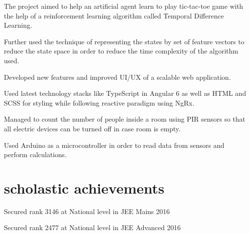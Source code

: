 \documentclass[]{deedy-resume-openfont}
\begin{document}
\begin{minipage}[t]{0.66\textwidth}
\begin{tightemize}
\item The project aimed to help an artificial agent learn to play tic-tac-toe game with the help of a  reinforcement learning algorithm called Temporal Difference Learning.
\item Further used the technique of representing the states by set of feature vectors to reduce the state space in order to reduce the time complexity of the algorithm used.
\end{tightemize}
\sectionsep

\begin{tightemize}
\item Developed new features and improved UI/UX of a scalable web application.
\item Used latest technology stacks like TypeScript in Angular 6 as well as HTML and SCSS for styling while following reactive paradigm using NgRx.
\end{tightemize}
\sectionsep

\begin{tightemize}
\item Managed to count the number of people inside a room using PIR sensors so that all electric devices can be turned off in case room is empty.
\item Used Arduino as a microcontroller in order to read data from sensors and perform  calculations.
\end{tightemize}
\sectionsep


\section{scholastic achievements} 
\vspace{\topsep} %
\begin{tightemize}
\item Secured rank 3146 at National level in JEE Mains 2016 \\ 
\item Secured rank 2477 at National level in JEE Advanced 2016
\end{tightemize}
\sectionsep


\end{minipage}
\end{document}
